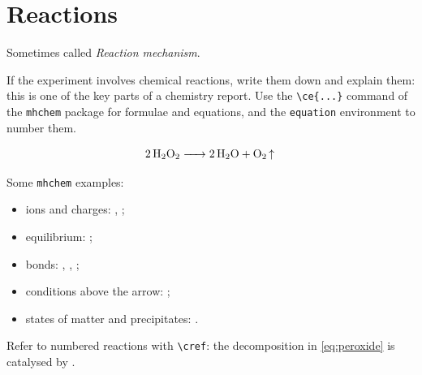 \section{Reactions}
Sometimes called \emph{Reaction mechanism}.

If the experiment involves chemical reactions, write them down and explain them: this is one of the key parts of a chemistry report. Use the \verb|\ce{...}| command of the \texttt{mhchem} package for formulae and equations, and the \texttt{equation} environment to number them.

\begin{equation}
    \ce{2 H2O2 -> 2 H2O + O2 ^}
    \label{eq:peroxide}
\end{equation}

Some \texttt{mhchem} examples:
\begin{itemize}
    \item ions and charges: , ;
    \item equilibrium: ;
    \item bonds: , , ;
    \item conditions above the arrow: ;
    \item states of matter and precipitates: .
\end{itemize}

Refer to numbered reactions with \verb|\cref|: the decomposition in \cref{eq:peroxide} is catalysed by .
